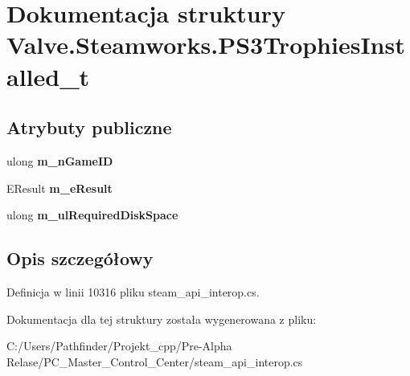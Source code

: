\hypertarget{struct_valve_1_1_steamworks_1_1_p_s3_trophies_installed__t}{}\section{Dokumentacja struktury Valve.\+Steamworks.\+P\+S3\+Trophies\+Installed\+\_\+t}
\label{struct_valve_1_1_steamworks_1_1_p_s3_trophies_installed__t}
\subsection*{Atrybuty publiczne}
\begin{DoxyCompactItemize}
\item 
\mbox{\label{struct_valve_1_1_steamworks_1_1_p_s3_trophies_installed__t_aa06308b72a656a34d849789c11044d89}} 
ulong {\bfseries m\+\_\+n\+Game\+ID}
\item 
\mbox{\label{struct_valve_1_1_steamworks_1_1_p_s3_trophies_installed__t_a274b1d4d12a26388b05f4f50e3191910}} 
E\+Result {\bfseries m\+\_\+e\+Result}
\item 
\mbox{\label{struct_valve_1_1_steamworks_1_1_p_s3_trophies_installed__t_a9806f476e62cef1f71c55cd0f230084a}} 
ulong {\bfseries m\+\_\+ul\+Required\+Disk\+Space}
\end{DoxyCompactItemize}


\subsection{Opis szczegółowy}


Definicja w linii 10316 pliku steam\+\_\+api\+\_\+interop.\+cs.



Dokumentacja dla tej struktury została wygenerowana z pliku\+:\begin{DoxyCompactItemize}
\item 
C\+:/\+Users/\+Pathfinder/\+Projekt\+\_\+cpp/\+Pre-\/\+Alpha Relase/\+P\+C\+\_\+\+Master\+\_\+\+Control\+\_\+\+Center/steam\+\_\+api\+\_\+interop.\+cs\end{DoxyCompactItemize}
